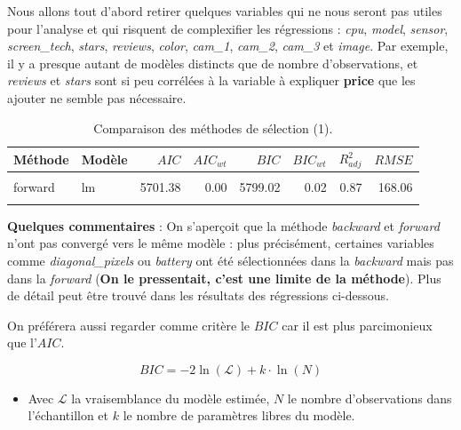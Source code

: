 \documentclass[
  12pt,
]{report}
\providecommand{\tightlist}{%
  \setlength{\itemsep}{0pt}\setlength{\parskip}{0pt}}\usepackage{longtable,booktabs,array}
\begin{document}
Nous allons tout d'abord retirer quelques variables qui ne nous seront
pas utiles pour l'analyse et qui risquent de complexifier les
régressions : \emph{cpu}, \emph{model}, \emph{sensor},
\emph{screen\_tech}, \emph{stars}, \emph{reviews}, \emph{color},
\emph{cam\_1}, \emph{cam\_2}, \emph{cam\_3} et \emph{image}. Par
exemple, il y a presque autant de modèles distincts que de nombre
d'observations, et \emph{reviews} et \emph{stars} sont si peu corrélées
à la variable à expliquer \textbf{price} que les ajouter ne semble pas
nécessaire.

\begin{table}[!h]
\centering
\caption{\label{tab:kable_perf}Comparaison des méthodes de sélection (1).}
\centering
\begin{tabular}[t]{llrrrrrr}
\toprule
\textbf{Méthode} & \textbf{Modèle} & \textbf{$AIC$} & \textbf{$AIC_{wt}$} & \textbf{$BIC$} & \textbf{$BIC_{wt}$} & \textbf{$R^2_{adj}$} & \textbf{$RMSE$}\\
\midrule
\cellcolor{gray!10}{backward} & \cellcolor{gray!10}{lm} & \cellcolor{gray!10}{5690.77} & \cellcolor{gray!10}{0.99} & \cellcolor{gray!10}{5800.62} & \cellcolor{gray!10}{0.01} & \cellcolor{gray!10}{0.88} & \cellcolor{gray!10}{164.86}\\
forward & lm & 5701.38 & 0.00 & 5799.02 & 0.02 & 0.87 & 168.06\\
\cellcolor{gray!10}{genetic} & \cellcolor{gray!10}{lm} & \cellcolor{gray!10}{5705.54} & \cellcolor{gray!10}{0.00} & \cellcolor{gray!10}{5790.98} & \cellcolor{gray!10}{0.97} & \cellcolor{gray!10}{0.87} & \cellcolor{gray!10}{170.05}\\
\bottomrule
\end{tabular}
\end{table}

\textbf{Quelques commentaires} : On s'aperçoit que la méthode
\emph{backward} et \emph{forward} n'ont pas convergé vers le même modèle
: plus précisément, certaines variables comme \emph{diagonal\_pixels} ou
\emph{battery} ont été sélectionnées dans la \emph{backward} mais pas
dans la \emph{forward} (\textbf{On le pressentait, c'est une limite de
la méthode}). Plus de détail peut être trouvé dans les résultats des
régressions ci-dessous.

On préférera aussi regarder comme critère le \(BIC\) car il est plus
parcimonieux que l'\(AIC\).

\[ BIC = -2\ln(\mathcal{L}) + k \cdot \ln(N) \]

\begin{itemize}
\tightlist
\item
  Avec \(\mathcal{L}\) la vraisemblance du modèle estimée, \(N\) le
  nombre d'observations dans l'échantillon et \(k\) le nombre de
  paramètres libres du modèle.
\end{itemize}
\end{document}
